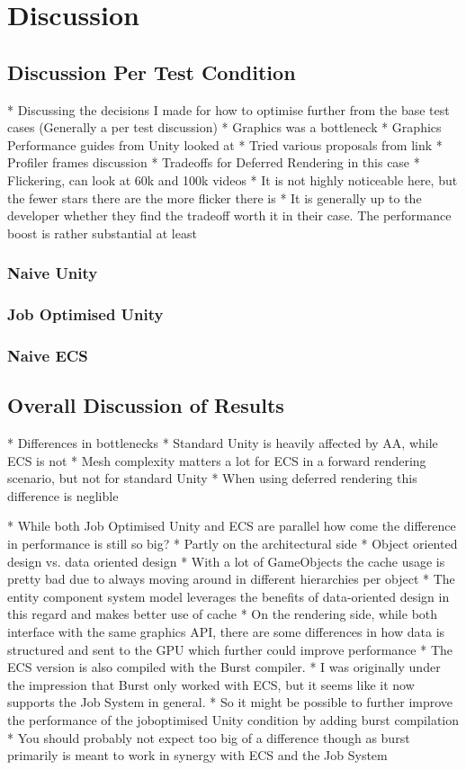 \chapter{Discussion}
\section{Discussion Per Test Condition}
   * Discussing the decisions I made for how to optimise further from the base test cases (Generally a per test discussion)
      * Graphics was a bottleneck
            * Graphics Performance guides from Unity looked at
                  * Tried various proposals from link
   * Profiler frames discussion 
      * Tradeoffs for Deferred Rendering in this case
         * Flickering, can look at 60k and 100k videos
         * It is not highly noticeable here, but the fewer stars there are the more flicker there is
         * It is generally up to the developer whether they find the tradeoff worth it in their case. The performance boost is rather substantial at least
\subsection{Naive Unity}
\subsection{Job Optimised Unity}
\subsection{Naive ECS}

\section{Overall Discussion of Results}
* Differences in bottlenecks
         * Standard Unity is heavily affected by AA, while ECS is not
         * Mesh complexity matters a lot for ECS in a forward rendering scenario, but not for standard Unity
            * When using deferred rendering this difference is neglible

   * While both Job Optimised Unity and ECS are parallel how come the difference in performance is still so big?
      * Partly on the architectural side
         * Object oriented design vs. data oriented design
         * With a lot of GameObjects the cache usage is pretty bad due to always moving around in different hierarchies per object
         * The entity component system model leverages the benefits of data-oriented design in this regard and makes better use of cache
         * On the rendering side, while both interface with the same graphics API, there are some differences in how data is structured and sent to the GPU which further could improve performance
      * The ECS version is also compiled with the Burst compiler.
         * I was originally under the impression that Burst only worked with ECS, but it seems like it now supports the Job System in general. 
         * So it might be possible to further improve the performance of the joboptimised Unity condition by adding burst compilation
         * You should probably not expect too big of a difference though as burst primarily is meant to work in synergy with ECS and the Job System

